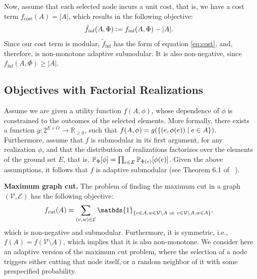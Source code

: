 \documentclass{article}
\newcommand{\defeq}{\vcentcolon=}
\let\originalleft\left
\let\originalright\right
\renewcommand{\left}{\mathopen{}\mathclose\bgroup\originalleft}
\renewcommand{\right}{\aftergroup\egroup\originalright}
\newcommand{\citet}[1]{\citeauthor{#1}~\shortcite{#1}}
\renewcommand{\paragraph}[1]{\vspace{0.3em}\noindent\textbf{#1.}\makebox[0.5em]{}}
\begin{document}
Now, assume that each selected node incurs a unit cost, that is, we have a cost term $f_{\textrm{cost}}(A) = |A|$, which results in the following objective:
\begin{align*}
  \tilde{f}_{\textrm{inf}}(A, \Phi) \defeq f_{\textrm{inf}}(A, \Phi) - |A|.
\end{align*}
Since our cost term is modular, $\tilde{f}_{\textrm{inf}}$ has the form of equation \eqref{eq:cost}, and, therefore, is non-monotone adaptive submodular.
It is also non-negative, since $f_{\textrm{inf}}(A, \Phi) \geq |A|$.

\subsection{Objectives with Factorial Realizations}
Assume we are given a utility function $f(A, \phi)$, whose dependence of $\phi$ is constrained to the outcomes of the selected elements.
More formally, there exists a function $g : 2^{E \times O} \to \mathbb{R}_{\geq 0}$, such that $f(A, \phi) = g\left(\{(e, \phi(e)) \mid e \in A\}\right)$.
Furthermore, assume that $f$ is submodular in its first argument, for any realization $\phi$, and that the distribution of realizations factorizes over the elements of the ground set $E$, that is, $\P[\Phi]{\phi} = \prod_{e \in E}\P[\Phi(e)]{\phi(e)}$.
Given the above assumptions, it follows that $f$ is adaptive submodular (see Theorem 6.1 of \citet{golovin11}).

\paragraph{Maximum graph cut}
The problem of finding the maximum cut in a graph $(\mathcal{V}, \mathcal{E})$ has the following objective:
\begin{align*}
  f_{\textrm{cut}}(A) = \sum_{(v, w) \in \mathcal{E}} \mathds{1}_{\left\{v \in A, w \in \mathcal{V}\setminus A\ \textrm{or}\ v \in \mathcal{V}\setminus A, w \in A\right\}},
\end{align*}
which is non-negative and submodular.
Furthermore, it is symmetric, i.e., $f(A) = f(\mathcal{V}\setminus A)$, which implies that it is also non-monotone.
We consider here an adaptive version of the maximum cut problem, where the selection of a node triggers either cutting that node itself, or a random neighbor of it with some prespecified probability.
\end{document}
